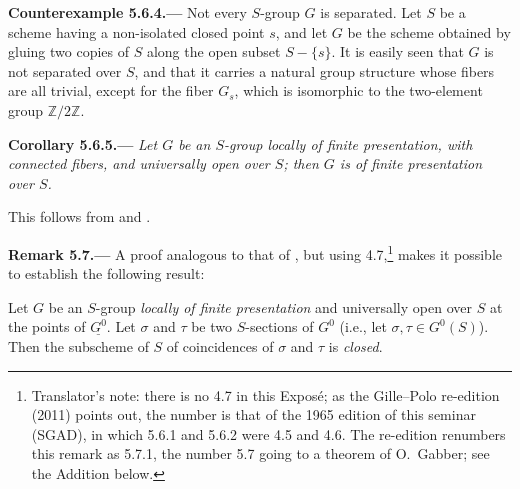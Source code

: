 
\medskip
{}\label{ctr:sga3-VIB-5.6.4}%
\noindent\textbf{Counterexample 5.6.4.---}
Not every \(S\)-group \(G\) is separated. Let \(S\) be a
scheme having a non-isolated closed point \(s\), and let \(G\) be
the scheme obtained by gluing two copies of \(S\) along the open
subset \(S-\{s\}\). It is easily seen that \(G\) is not separated
over \(S\), and that it carries a natural group structure
whose fibers are all trivial, except for the fiber \(G_s\), which
is isomorphic to the two-element group
\(\mathbb Z/2\mathbb Z\).

\medskip
{}\label{cor:sga3-VIB-5.6.5}%
\noindent\textbf{Corollary 5.6.5.---}
\emph{Let \(G\) be an \(S\)-group locally of finite presentation, with
connected fibers, and universally open over \(S\); then \(G\) is of
finite presentation over \(S\).}

This follows from  and
.

\medskip
{}\label{rem:sga3-VIB-5.7}%
\noindent\textbf{Remark 5.7.---}
A proof analogous to that of , but
using 4.7,\footnote{Translator's note: there is no 4.7 in this Expos\'e;
as the Gille--Polo re-edition (2011) points out, the number is that of the
1965 edition of this seminar (SGAD), in which 5.6.1 and 5.6.2 were 4.5
and 4.6. The re-edition renumbers this remark as 5.7.1, the number 5.7
going to a theorem of O.~Gabber; see the Addition below.} makes
it possible to establish the following result:

Let \(G\) be an \(S\)-group \emph{locally of finite presentation} and
universally open over \(S\) at the points of \(\underline{G^0}\). Let
\(\sigma\) and \(\tau\) be two \(S\)-sections of \(G^0\) (i.e., let
\(\sigma,\tau\in G^0(S)\)). Then the subscheme of \(S\) of coincidences
of \(\sigma\) and \(\tau\) is \emph{closed}.

